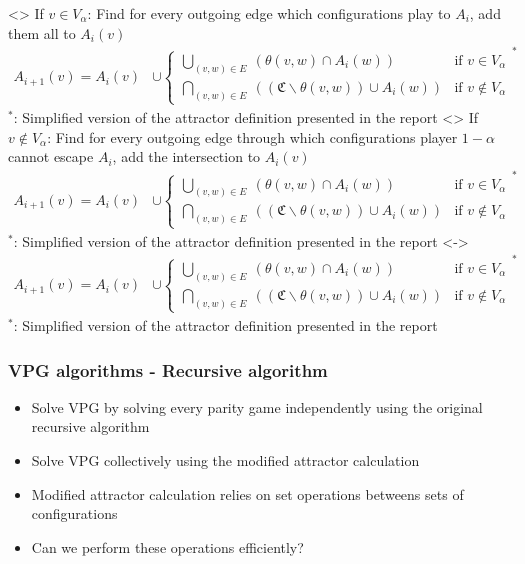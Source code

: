 \documentclass[aspectratio=169]{beamer}
\newcounter{picite}
\begin{document}
\begin{frame}[t]
\only<\thepicite>{%
\mbox{}\vfill
If $v \in V_\alpha$: Find for every outgoing edge which configurations play to $A_i$, add them all to $A_i(v)$
\begin{align*}
A_{i+1}(v) = A_i(v) &\cup \begin{cases}
\bigcup_{(v,w)\in E}\ (\theta(v,w) \cap A_i(w)) & \text{if }v \in V_\alpha\\
\bigcap_{(v,w)\in E}\ ((\mathfrak{C}\backslash \theta(v,w)) \cup A_i(w)) & \text{if }v \notin V_\alpha
\end{cases}^*
\end{align*}
\tiny$^*$: Simplified version of the attractor definition presented in the report}\pause
{}\only<\thepicite>{%
\mbox{}\vfill
If $v \notin V_\alpha$: Find for every outgoing edge through which configurations player $1 - \alpha$ cannot escape $A_i$, add the intersection to $A_i(v)$
\begin{align*}
A_{i+1}(v) = A_i(v) &\cup \begin{cases}
\bigcup_{(v,w)\in E}\ (\theta(v,w) \cap A_i(w)) & \text{if }v \in V_\alpha\\
\bigcap_{(v,w)\in E}\ ((\mathfrak{C}\backslash \theta(v,w)) \cup A_i(w)) & \text{if }v \notin V_\alpha
\end{cases}^*
\end{align*}
\tiny$^*$: Simplified version of the attractor definition presented in the report}\pause
{}\only<\thepicite->{%
\mbox{}\vfill
\begin{align*}
A_{i+1}(v) = A_i(v) &\cup \begin{cases}
\bigcup_{(v,w)\in E}\ (\theta(v,w) \cap A_i(w)) & \text{if }v \in V_\alpha\\
\bigcap_{(v,w)\in E}\ ((\mathfrak{C}\backslash \theta(v,w)) \cup A_i(w)) & \text{if }v \notin V_\alpha
\end{cases}^*
\end{align*}
\tiny$^*$: Simplified version of the attractor definition presented in the report}\pause

\pause\pause\pause
\end{frame}

\begin{frame}[t]
\frametitle{VPG algorithms - Recursive algorithm}
\begin{itemize}
	\item Solve VPG by solving every parity game independently using the original recursive algorithm
	\item Solve VPG collectively using the modified attractor calculation\pause
	\item Modified attractor calculation relies on set operations betweens sets of configurations
	\item Can we perform these operations efficiently?
\end{itemize}
\end{frame}
\end{document}
